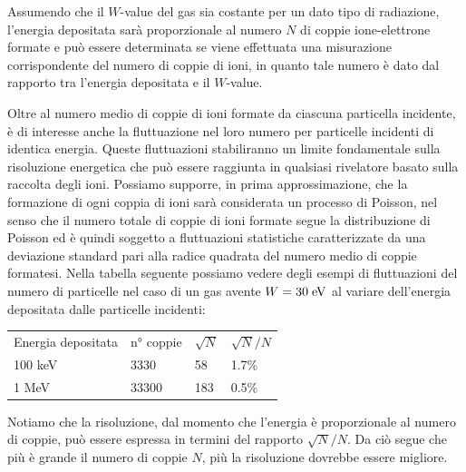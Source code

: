 Assumendo che il $W$-value del gas sia costante per un dato tipo di radiazione, l'energia depositata sarà proporzionale al numero $N$ di coppie ione-elettrone formate e può essere determinata se viene effettuata una misurazione corrispondente del numero di coppie di ioni, in quanto tale numero è dato dal rapporto tra l'energia depositata e il $W$-value.

Oltre al numero medio di coppie di ioni formate da ciascuna particella incidente, è di interesse anche la fluttuazione nel loro numero per particelle incidenti di identica energia. Queste fluttuazioni stabiliranno un limite fondamentale sulla risoluzione energetica che può essere raggiunta in qualsiasi rivelatore basato sulla raccolta degli ioni. Possiamo supporre, in prima approssimazione, che la formazione di ogni coppia di ioni sarà considerata un processo di Poisson, nel senso che il numero totale di coppie di ioni formate segue la distribuzione di Poisson ed è quindi soggetto a fluttuazioni statistiche caratterizzate da una deviazione standard pari alla radice quadrata del numero medio di coppie formatesi. Nella tabella seguente possiamo vedere degli esempi di fluttuazioni del numero di particelle nel caso di un gas avente $W=30 \rm \; eV$ al variare dell'energia depositata dalle particelle incidenti:

\begin{center}
   \begin{tabular}{llll}
      Energia depositata & n° coppie & $\sqrt{N}$ & $\sqrt{N}/N$\\[0.2cm]
      100 keV & 3330 & 58 & 1.7\%\\[0.2cm]
      1 MeV & 33300 & 183 & 0.5\%
   \end{tabular}
\end{center}

Notiamo che la risoluzione, dal momento che l'energia è proporzionale al numero di coppie, può essere espressa in termini del rapporto $\sqrt{N}/N$. Da ciò segue che più è grande il numero di coppie $N$, più la risoluzione dovrebbe essere migliore.

